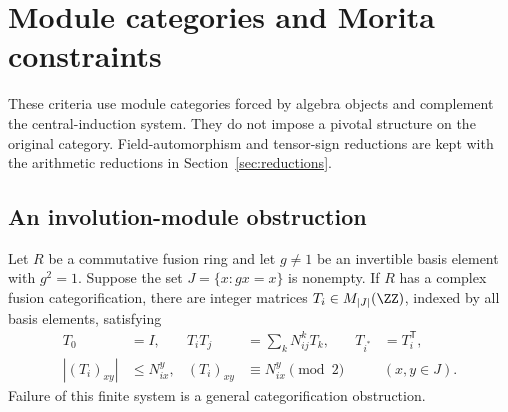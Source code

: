 \section{Module categories and Morita constraints}\label{sec:newalgebra}
These criteria use module categories forced by algebra objects and
complement the central-induction system. They do not impose a pivotal
structure on the original category. Field-automorphism and tensor-sign
reductions are kept with the arithmetic reductions in
Section~\ref{sec:reductions}.

\subsection{An involution-module obstruction}
\begin{theorem}\label{thm:involution}
Let $R$ be a commutative fusion ring and let $g\ne1$ be an invertible basis
element with $g^2=1$. Suppose the set $J=\{x:gx=x\}$ is nonempty. If $R$
has a complex fusion categorification, there are integer matrices
$T_i\in M_{|J|}(\ZZ)$, indexed by all basis elements, satisfying
\begin{align}
 T_0&=I,&T_iT_j&=\sum_kN_{ij}^kT_k,&T_{i^*}&=T_i^{\mathsf T},\label{eq:module-rep}\\
 |(T_i)_{xy}|&\le N_{ix}^{y},&
 (T_i)_{xy}&\equiv N_{ix}^{y}\pmod2 &&(x,y\in J).\label{eq:module-bound}
\end{align}
Failure of this finite system is a general categorification obstruction.
\end{theorem}
